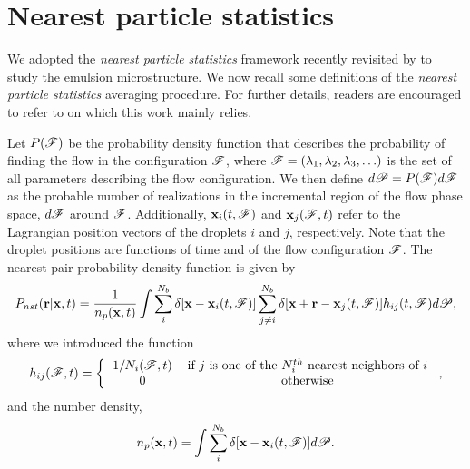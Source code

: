 \section{Nearest particle statistics}
\label{sec:nearest}

We adopted the \textit{nearest particle statistics} framework recently revisited by \citet{zhang2021ensemble} to study the emulsion microstructure.
We now recall some definitions of the \textit{nearest particle statistics} averaging procedure. 
For further details, readers are encouraged to refer to \citet{zhang2021ensemble,zhang2023evolution} on which this work mainly relies.

Let $P(\mathscr{F})$ be the probability density function that describes the probability of finding the flow in the configuration $\mathscr{F}$, where $\mathscr{F} = (\lambda_1,\lambda_2,\lambda_3,\ldots)$ is the set of all parameters describing the flow configuration.
We then define $d\mathscr{P} = P(\mathscr{F})d\mathscr{F}$ as the probable number of realizations in the incremental region of the flow phase space, $d\mathscr{F}$ around $\mathscr{F}$.
Additionally,  $\textbf{x}_i(t,\mathscr{F})$ and $\textbf{x}_j(\mathscr{F},t)$ refer to the Lagrangian position vectors of the droplets $i$ and $j$, respectively. 
Note that the droplet positions are functions of time and of the flow configuration $\mathscr{F}$. 
The nearest pair probability density function is given by \citep{zhang2021ensemble,zhang2023evolution}
\begin{equation}
    P_{nst}(\textbf{r}|\textbf{x},t)= \frac{1}{n_p(\textbf{x},t)}
    \int \sum_{i}^{N_b}\delta[\textbf{x}-\textbf{x}_i(t,\FF)]
    \sum_{j\neq i}^{N_b}\delta[\textbf{x}+\textbf{r}-\textbf{x}_j(t,\FF)]
    h_{ij} (t,\FF)
    d\mathscr{P},
    \label{eq:P_nstij}
\end{equation}
where we introduced the function 
\begin{equation*}
    h_{ij}(\FF,t)
    = \left\{
        \begin{tabular}{cc}
            $1/N_i(\FF,t)$ & if $j$ is one of the $N^{th}_i$ nearest neighbors of $i$ \\
            0& otherwise
        \end{tabular}
        \right. ,
\end{equation*}
and the number density, 
\begin{equation}
    n_p(\textbf{x},t)= 
    \int \sum_{i}^{N_b}\delta[\textbf{x}-\textbf{x}_i(t,\FF)] d\mathscr{P}.
    \label{eq:n_p}
\end{equation}
